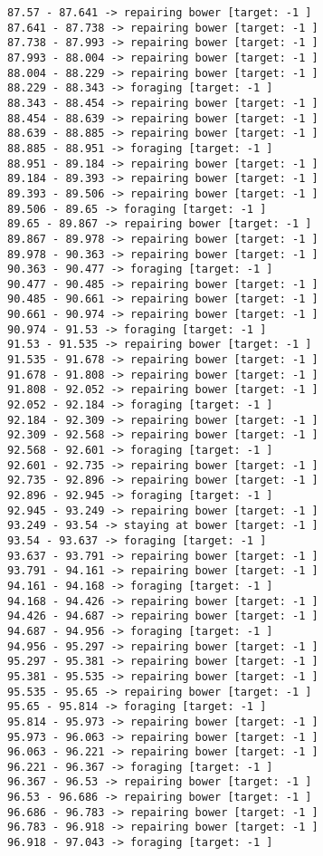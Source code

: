 \documentclass[11pt]{article}
\begin{document}
\begin{Verbatim}[commandchars=\\\{\}]
87.57 - 87.641 -> repairing bower [target: -1 ]
87.641 - 87.738 -> repairing bower [target: -1 ]
87.738 - 87.993 -> repairing bower [target: -1 ]
87.993 - 88.004 -> repairing bower [target: -1 ]
88.004 - 88.229 -> repairing bower [target: -1 ]
88.229 - 88.343 -> foraging [target: -1 ]
88.343 - 88.454 -> repairing bower [target: -1 ]
88.454 - 88.639 -> repairing bower [target: -1 ]
88.639 - 88.885 -> repairing bower [target: -1 ]
88.885 - 88.951 -> foraging [target: -1 ]
88.951 - 89.184 -> repairing bower [target: -1 ]
89.184 - 89.393 -> repairing bower [target: -1 ]
89.393 - 89.506 -> repairing bower [target: -1 ]
89.506 - 89.65 -> foraging [target: -1 ]
89.65 - 89.867 -> repairing bower [target: -1 ]
89.867 - 89.978 -> repairing bower [target: -1 ]
89.978 - 90.363 -> repairing bower [target: -1 ]
90.363 - 90.477 -> foraging [target: -1 ]
90.477 - 90.485 -> repairing bower [target: -1 ]
90.485 - 90.661 -> repairing bower [target: -1 ]
90.661 - 90.974 -> repairing bower [target: -1 ]
90.974 - 91.53 -> foraging [target: -1 ]
91.53 - 91.535 -> repairing bower [target: -1 ]
91.535 - 91.678 -> repairing bower [target: -1 ]
91.678 - 91.808 -> repairing bower [target: -1 ]
91.808 - 92.052 -> repairing bower [target: -1 ]
92.052 - 92.184 -> foraging [target: -1 ]
92.184 - 92.309 -> repairing bower [target: -1 ]
92.309 - 92.568 -> repairing bower [target: -1 ]
92.568 - 92.601 -> foraging [target: -1 ]
92.601 - 92.735 -> repairing bower [target: -1 ]
92.735 - 92.896 -> repairing bower [target: -1 ]
92.896 - 92.945 -> foraging [target: -1 ]
92.945 - 93.249 -> repairing bower [target: -1 ]
93.249 - 93.54 -> staying at bower [target: -1 ]
93.54 - 93.637 -> foraging [target: -1 ]
93.637 - 93.791 -> repairing bower [target: -1 ]
93.791 - 94.161 -> repairing bower [target: -1 ]
94.161 - 94.168 -> foraging [target: -1 ]
94.168 - 94.426 -> repairing bower [target: -1 ]
94.426 - 94.687 -> repairing bower [target: -1 ]
94.687 - 94.956 -> foraging [target: -1 ]
94.956 - 95.297 -> repairing bower [target: -1 ]
95.297 - 95.381 -> repairing bower [target: -1 ]
95.381 - 95.535 -> repairing bower [target: -1 ]
95.535 - 95.65 -> repairing bower [target: -1 ]
95.65 - 95.814 -> foraging [target: -1 ]
95.814 - 95.973 -> repairing bower [target: -1 ]
95.973 - 96.063 -> repairing bower [target: -1 ]
96.063 - 96.221 -> repairing bower [target: -1 ]
96.221 - 96.367 -> foraging [target: -1 ]
96.367 - 96.53 -> repairing bower [target: -1 ]
96.53 - 96.686 -> repairing bower [target: -1 ]
96.686 - 96.783 -> repairing bower [target: -1 ]
96.783 - 96.918 -> repairing bower [target: -1 ]
96.918 - 97.043 -> foraging [target: -1 ]

\end{Verbatim}
\end{document}
